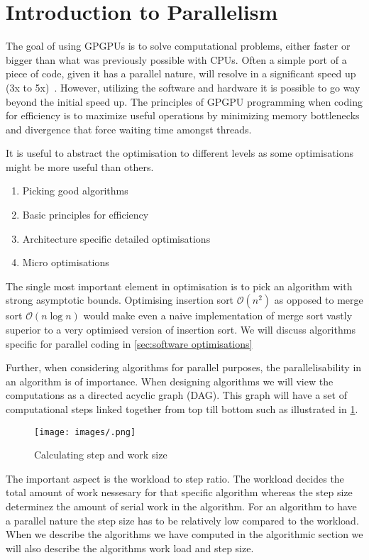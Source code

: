 \section{Introduction to Parallelism}
\label{sec:introduction to parallelism}
The goal of using GPGPUs is to solve computational problems, either faster or bigger than what was previously possible with CPUs.
Often a simple port of a piece of code, given it has a parallel nature, will resolve in a significant speed up (3x to 5x)~\cite{udacity}.
However, utilizing the software and hardware it is possible to go way beyond the initial speed up.
The principles of GPGPU programming when coding for efficiency is to maximize useful operations by minimizing memory bottlenecks and divergence that force waiting time amongst threads.

It is useful to abstract the optimisation to different levels as some optimisations might be more useful than others.

\begin{enumerate}
\item Picking good algorithms
\item Basic principles for efficiency
\item Architecture specific detailed optimisations
\item Micro optimisations
\end{enumerate}

The single most important element in optimisation is to pick an algorithm with strong asymptotic bounds.
Optimising insertion sort $\mathcal{O}(n^2)$ as opposed to merge sort $\mathcal{O}(n\log n)$ would make even a naive implementation of merge sort vastly superior to a very optimised version of insertion sort.
We will discuss algorithms specific for parallel coding in \cref{sec:software optimisations}

Further, when considering algorithms for parallel purposes, the parallelisability in an algorithm is of importance.
When designing algorithms we will view the computations as a directed acyclic graph (DAG).
This graph will have a set of computational steps linked together from top till bottom such as illustrated in \cref{fig:step and work}.

\begin{figure}[htb]
  \centering
  \texttt{[image: images/.png]}
  \caption{Calculating step and work size}
  \label{fig:step and work}
\end{figure}

The important aspect is the workload to step ratio. The workload decides the total amount of work nessesary for that specific algorithm whereas the step size determinez the amount of serial work in the algorithm.
For an algorithm to have a parallel nature the step size has to be relatively low compared to the workload.
When we describe the algorithms we have computed in the algorithmic section we will also describe the algorithms work load and step size.

